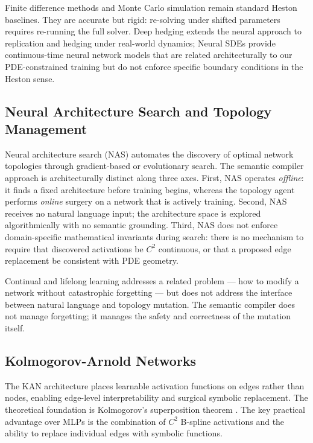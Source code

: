 \documentclass[11pt,a4paper]{article}
\begin{document}
Finite difference methods \citep{wilmott1993option} and Monte Carlo simulation remain
standard Heston baselines. They are accurate but rigid: re-solving under shifted
parameters requires re-running the full solver. Deep hedging \citep{buhler2019deep}
extends the neural approach to replication and hedging under real-world dynamics;
Neural SDEs \citep{kidger2021neural} provide continuous-time neural network models
that are related architecturally to our PDE-constrained training but do not enforce
specific boundary conditions in the Heston sense.

\subsection{Neural Architecture Search and Topology Management}

Neural architecture search (NAS) \citep{elsken2019neural} automates the discovery of
optimal network topologies through gradient-based \citep{liu2019darts} or evolutionary
search. The semantic compiler approach is architecturally distinct along three axes.
First, NAS operates \emph{offline}: it finds a fixed architecture before training begins,
whereas the topology agent performs \emph{online} surgery on a network that is actively
training. Second, NAS receives no natural language input; the architecture space is
explored algorithmically with no semantic grounding. Third, NAS does not enforce
domain-specific mathematical invariants during search: there is no mechanism to require
that discovered activations be $C^2$ continuous, or that a proposed edge replacement be
consistent with PDE geometry.

Continual and lifelong learning \citep{kirkpatrick2017overcoming} addresses a related
problem --- how to modify a network without catastrophic forgetting --- but does not
address the interface between natural language and topology mutation. The semantic
compiler does not manage forgetting; it manages the safety and correctness of the
mutation itself.

\subsection{Kolmogorov-Arnold Networks}

The KAN architecture \citep{liu_etal_2024_kan} places learnable activation functions on
edges rather than nodes, enabling edge-level interpretability and surgical symbolic
replacement. The theoretical foundation is Kolmogorov's superposition theorem
\citep{kolmogorov1957representation}. The key practical advantage over MLPs is the
combination of $C^2$ B-spline activations and the ability to replace individual edges
with symbolic functions.
\end{document}
